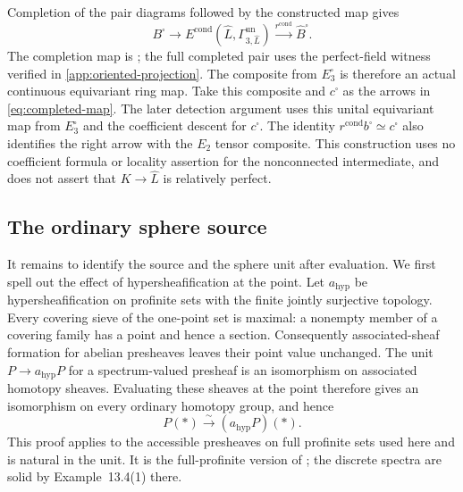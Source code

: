 \documentclass[11pt]{article}
\numberwithin{equation}{section}
\theoremstyle{definition}
\theoremstyle{remark}
\begin{document}
Completion of the pair diagrams followed by the constructed map gives
\[
 B^\square\longrightarrow
 E^{\mathrm{cond}}(\widehat L,\Gamma^{\mathrm{un}}_{3,\widehat L})
 \xrightarrow{r^{\mathrm{cond}}}\widehat B^\square.
\]
The completion map is \cite[Example~4.6.4]{BMR2026}; the full completed
pair uses the perfect-field witness verified in
\cref{app:oriented-projection}. The composite from \(E_3^\square\)
is therefore an actual continuous equivariant ring map. Take this
composite and \(c^\square\) as the arrows in \eqref{eq:completed-map}.
The later detection argument uses this unital equivariant map from
\(E_3^\square\) and the coefficient descent for \(c^\square\).
The identity \(r^{\mathrm{cond}}b^\square\simeq c^\square\) also
identifies the right arrow with the \(E_2\) tensor composite.
This construction uses no coefficient formula
or locality assertion for the nonconnected intermediate, and does not
assert that \(K\to\widehat L\) is relatively perfect.

\subsection{The ordinary sphere source}

It remains to identify the source and the sphere unit after evaluation.
We first spell out the effect of hypersheafification at the point. Let \(a_{\mathrm{hyp}}\) be
hypersheafification on profinite sets with the finite jointly surjective
topology. Every covering sieve of the one-point set is maximal: a
nonempty member of a covering family has a point and hence a section.
Consequently associated-sheaf formation for abelian presheaves leaves
their point value unchanged. The unit
\(P\to a_{\mathrm{hyp}}P\) for a spectrum-valued presheaf is an
isomorphism on associated homotopy sheaves. Evaluating these sheaves at
the point therefore gives an isomorphism on every ordinary homotopy
group, and hence
\[
 P(*)\xrightarrow{\sim}(a_{\mathrm{hyp}}P)(*).
\]
This proof applies to the accessible presheaves on full profinite sets
used here and is natural in the unit. It is the full-profinite version of
\cite[Lemma~13.5 and Remark~13.6]{Clausen2025}; the discrete spectra are
solid by Example~13.4(1) there.
\end{document}
